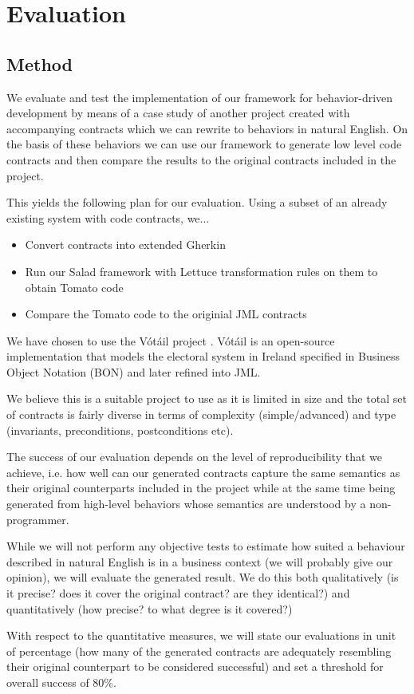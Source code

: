 \section{Evaluation}
\label{sec:Evaluation}
\subsection{Method}

We evaluate and test the implementation of our framework for behavior-driven development by means of a case study of another project created with accompanying contracts which we can rewrite to behaviors in natural English. On the basis of these behaviors we can use our framework to generate low level code contracts and then compare the results to the original contracts included in the project.
 
This yields the following plan for our evaluation. Using a subset of an already existing system with code contracts, we...

\begin{itemize}
	\item Convert contracts into extended Gherkin
	\item Run our Salad framework with Lettuce transformation rules on them to obtain Tomato code
	\item Compare the Tomato code to the originial JML contracts
\end{itemize}

We have chosen to use the V\'{o}t\'{a}il project \cite{votailCochranKiniry}. V\'{o}t\'{a}il is an open-source implementation that models the electoral system in Ireland specified in Business Object Notation (BON) \cite{bonmethod} and later refined into JML.
 
We believe this is a suitable project to use as it is limited in size and the total set of contracts is fairly diverse in terms of complexity (simple/advanced) and type (invariants, preconditions, postconditions etc).

The success of our evaluation depends on the level of reproducibility that we achieve, i.e. how well can our generated contracts capture the same semantics as their original counterparts included in the project while at the same time being generated from high-level behaviors whose semantics are understood by a non-programmer.
 
While we will not perform any objective tests to estimate how suited a behaviour described in natural English is in a business context (we will probably give our opinion), we will evaluate the generated result. We do this both qualitatively (is it precise? does it cover the original contract? are they identical?) and quantitatively (how precise? to what degree is it covered?)
 
With respect to the quantitative measures, we will state our evaluations in unit of percentage (how many of the generated contracts are adequately resembling their original counterpart to be considered successful) and set a threshold for overall success of 80\%.

